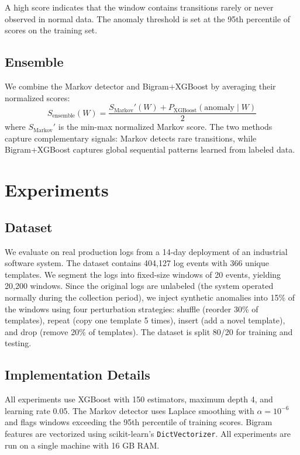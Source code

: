 \documentclass[11pt]{article}
\begin{document}
A high score indicates that the window contains transitions rarely or never observed in normal data.
The anomaly threshold is set at the 95th percentile of scores on the training set.

\subsection{Ensemble}

We combine the Markov detector and Bigram+XGBoost by averaging their normalized scores:
\begin{equation}
    S_{\text{ensemble}}(W) = \frac{S_{\text{Markov}}'(W) + P_{\text{XGBoost}}(\text{anomaly} \mid W)}{2}
    \label{eq:ensemble}
\end{equation}
where $S_{\text{Markov}}'$ is the min-max normalized Markov score.
The two methods capture complementary signals: Markov detects rare transitions, while Bigram+XGBoost captures global sequential patterns learned from labeled data.

\section{Experiments}
\label{sec:experiments}

\subsection{Dataset}

We evaluate on real production logs from a 14-day deployment of an industrial software system.
The dataset contains 404,127 log events with 366 unique templates.
We segment the logs into fixed-size windows of 20 events, yielding 20,200 windows.
Since the original logs are unlabeled (the system operated normally during the collection period), we inject synthetic anomalies into 15\% of the windows using four perturbation strategies: shuffle (reorder 30\% of templates), repeat (copy one template 5 times), insert (add a novel template), and drop (remove 20\% of templates).
The dataset is split 80/20 for training and testing.

\subsection{Implementation Details}

All experiments use XGBoost with 150 estimators, maximum depth 4, and learning rate 0.05.
The Markov detector uses Laplace smoothing with $\alpha = 10^{-6}$ and flags windows exceeding the 95th percentile of training scores.
Bigram features are vectorized using scikit-learn's \texttt{DictVectorizer}.
All experiments are run on a single machine with 16 GB RAM.
\end{document}
